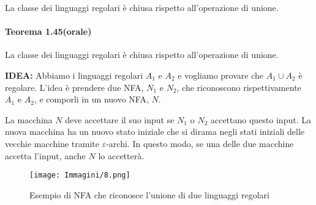 \documentclass{article}
\begin{document}
La classe dei linguaggi regolari è chiusa rispetto all'operazione di unione.
\paragraph{Teorema 1.45(orale)}
\text{  }
\begin{tcolorbox}[colback=orange!10!white, colframe=orange!50!black, title=Teorema 1.45 (orale)]
La classe dei linguaggi regolari è chiusa rispetto all'operazione di unione.
\end{tcolorbox}


\textbf{IDEA:}
Abbiamo i linguaggi regolari $A_1$ e $A_2$ e vogliamo provare che $A_1 \cup A_2$ è regolare. L'idea è prendere due NFA, $N_1$ e $N_2$, che riconoscono rispettivamente $A_1$ e $A_2$, e comporli in un nuovo NFA, $N$.

La macchina $N$ deve accettare il suo input se $N_1$ o $N_2$ accettano questo input. La nuova macchina ha un nuovo stato iniziale che si dirama negli stati iniziali delle vecchie macchine tramite $\varepsilon$-archi. In questo modo, se una delle due macchine accetta l'input, anche $N$ lo accetterà.

\begin{figure}[H]
    \centering
    \texttt{[image: Immagini/8.png]}
    \caption{Esempio di NFA che riconosce l'unione di due linguaggi regolari}
    \label{fig:nfa_union1}
\end{figure}
\end{document}
